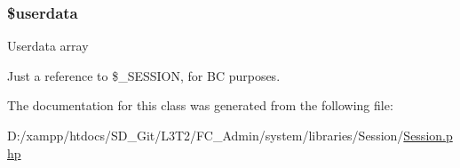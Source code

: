 \subsubsection[{\$userdata}]{\setlength{\rightskip}{0pt plus 5cm}\${\bf userdata}}\label{class_c_i___session_af70e594e86a310311c717b13e6ecac00}
Userdata array

Just a reference to \$\+\_\+\+S\+E\+S\+S\+I\+O\+N, for B\+C purposes. 

The documentation for this class was generated from the following file\+:\begin{DoxyCompactItemize}
\item 
D\+:/xampp/htdocs/\+S\+D\+\_\+\+Git/\+L3\+T2/\+F\+C\+\_\+\+Admin/system/libraries/\+Session/\hyperlink{system_2libraries_2_session_2_session_8php}{Session.\+php}\end{DoxyCompactItemize}
